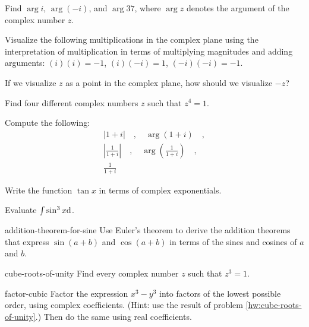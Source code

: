 \begin{hwsection}

\begin{hw}
Find $\arg i$, $\arg(-i)$, and $\arg 37$, where $\arg z$ denotes the argument of the complex number $z$.
\end{hw}

\begin{hw}
Visualize the following multiplications in the complex plane using the interpretation of multiplication
in terms of multiplying magnitudes and adding arguments: $(i)(i)=-1$, $(i)(-i)=1$, $(-i)(-i)=-1$.
\end{hw}

\begin{hw}
If we visualize $z$ as a point in the complex plane, how should we visualize $-z$?
\end{hw}

\begin{hw}
Find four different complex numbers $z$ such that $z^4=1$.
\end{hw}

\begin{hw}
Compute the following: 
\begin{gather*}
|1+i| \quad , \quad \arg(1+i) \quad , \\
  \left|\frac{1}{1+i}\right| \quad , \quad \arg\left(\frac{1}{1+i}\right) \quad , \\
  \frac{1}{1+i}
\end{gather*}
\end{hw}

\begin{hw}
Write the function $\tan x$ in terms of complex exponentials.
\end{hw}

\begin{hw}
Evaluate $\int \sin^3 x \textup{d} $.
\end{hw}

\begin{hwwithsoln}{addition-theorem-for-sine}
Use Euler's theorem to derive the addition theorems that express
$\sin(a+b)$ and $\cos(a+b)$ in terms of the sines and cosines of
$a$ and $b$.
\end{hwwithsoln}

\begin{hwwithsoln}{cube-roots-of-unity}
Find every complex number $z$ such that $z^3=1$.
\end{hwwithsoln}

\begin{hwwithsoln}{factor-cubic}
Factor the expression $x^3-y^3$ into factors of the lowest possible
order, using complex coefficients. (Hint: use the result of problem \ref{hw:cube-roots-of-unity}.) Then do the same using real
coefficients.
\end{hwwithsoln}



\end{hwsection}
